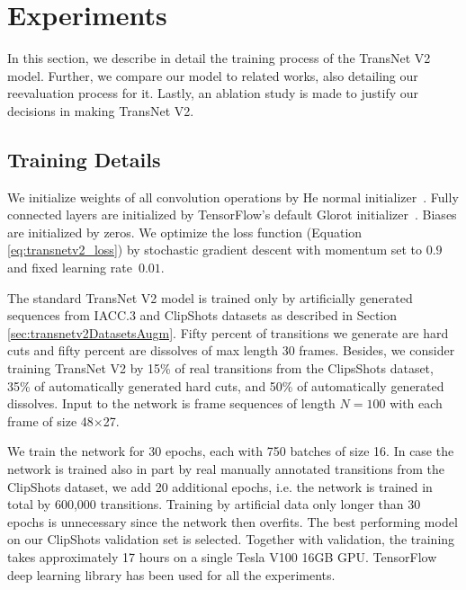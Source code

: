 \clearpage
\section{Experiments}\label{sec:transnetv2_evaluation}
In this section, we describe in detail the training process of the TransNet V2 model. Further, we compare our model to related works, also detailing our reevaluation process for it. Lastly, an ablation study is made to justify our decisions in making TransNet V2.

\subsection{Training Details}
We initialize weights of all convolution operations by He normal initializer~\cite{He_2015_ICCV}. Fully connected layers are initialized by TensorFlow's default Glorot initiali\-zer~\cite{Xavier_Glorot_init}. Biases are initialized by zeros.
We optimize the loss function (Equation \ref{eq:transnetv2_loss}) by stochastic gradient descent with momentum set to $0.9$ and fixed learning rate~$0.01$.

The standard TransNet V2 model is trained only by artificially generated sequences from IACC.3 and ClipShots datasets as described in Section \ref{sec:transnetv2DatasetsAugm}. Fifty percent of transitions we generate are hard cuts and fifty percent are dissolves of max length 30 frames. Besides, we consider training TransNet V2 by 15\% of real transitions from the ClipsShots dataset, 35\% of automatically generated hard cuts, and 50\% of automatically generated dissolves. Input to the network is frame sequences of length $N=100$ with each frame of size 48$\times$27.

We train the network for 30 epochs, each with 750 batches of size 16. In case the network is trained also in part by real manually annotated transitions from the ClipShots dataset, we add 20 additional epochs, i.e. the network is trained in total by 600,000 transitions. Training by artificial data only longer than 30 epochs is unnecessary since the network then overfits. The best performing model on our ClipShots validation set is selected. Together with validation, the training takes approximately 17 hours on a single Tesla V100 16GB GPU. TensorFlow deep learning library has been used for all the experiments.

